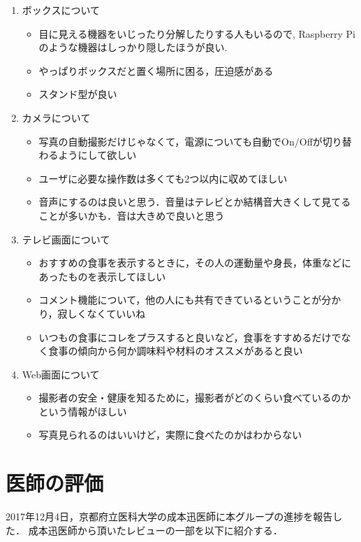 \documentclass[../report]{subfiles}
\begin{document}
\begin{enumerate}
    \item[] ボックスについて
    \begin{itemize}
        \item 目に見える機器をいじったり分解したりする人もいるので, Raspberry Piのような機器はしっかり隠したほうが良い.
        \item やっぱりボックスだと置く場所に困る，圧迫感がある
        \item スタンド型が良い
    \end{itemize}

    \item[] カメラについて
    \begin{itemize}
        \item 写真の自動撮影だけじゃなくて，電源についても自動でOn/Offが切り替わるようにして欲しい
        \item ユーザに必要な操作数は多くても2つ以内に収めてほしい
        \item 音声にするのは良いと思う．音量はテレビとか結構音大きくして見てることが多いかも．音は大きめで良いと思う
    \end{itemize}

    \item[] テレビ画面について
    \begin{itemize}
        \item おすすめの食事を表示するときに，その人の運動量や身長，体重などにあったものを表示してほしい
        \item コメント機能について，他の人にも共有できているということが分かり，寂しくなくていいね
        \item いつもの食事にコレをプラスすると良いなど，食事をすすめるだけでなく食事の傾向から何か調味料や材料のオススメがあると良い
    \end{itemize}

    \item[] Web画面について
    \begin{itemize}
        \item 撮影者の安全・健康を知るために，撮影者がどのくらい食べているのかという情報がほしい
        \item 写真見られるのはいいけど，実際に食べたのかはわからない
    \end{itemize}
\end{enumerate}

\section{医師の評価}
2017年12月4日，京都府立医科大学の成本迅医師に本グループの進捗を報告した．
成本迅医師から頂いたレビューの一部を以下に紹介する．
\end{document}

